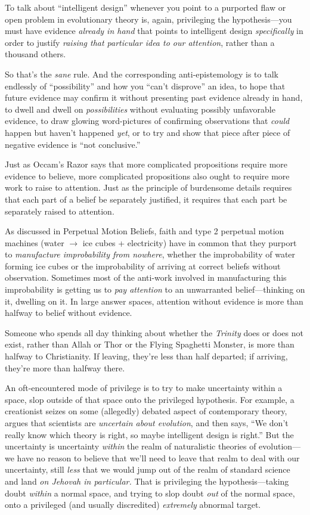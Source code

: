 {
 To talk about ``intelligent
design'' whenever you point to a purported flaw or
open problem in evolutionary theory is, again, privileging the
hypothesis---you must have evidence \textit{already in hand} that
points to intelligent design \textit{specifically} in order to justify
\textit{raising that particular idea to our attention}, rather than a
thousand others.}

{
 So that's the \textit{sane} rule. And the
corresponding anti-epistemology is to talk endlessly of
``possibility'' and how you
``can't disprove''
an idea, to hope that future evidence may confirm it without presenting
past evidence already in hand, to dwell and dwell on
\textit{possibilities} without evaluating possibly unfavorable
evidence, to draw glowing word-pictures of confirming observations that
\textit{could} happen but haven't happened
\textit{yet}, or to try and show that piece after piece of negative
evidence is ``not conclusive.''}

{
 Just as Occam's Razor says that more complicated
propositions require more evidence to believe, more complicated
propositions also ought to require more work to raise to attention.
Just as the principle of burdensome details requires that each part of
a belief be separately justified, it requires that each part be
separately raised to attention.}

{
 As discussed in Perpetual Motion Beliefs, faith and type 2
perpetual motion machines (water $\rightarrow $ ice cubes +
electricity) have in common that they purport to \textit{manufacture
improbability from nowhere}, whether the improbability of water forming
ice cubes or the improbability of arriving at correct beliefs without
observation. Sometimes most of the anti-work involved in manufacturing
this improbability is getting us to \textit{pay attention} to an
unwarranted belief---thinking on it, dwelling on it. In large answer
spaces, attention without evidence is more than halfway to belief
without evidence.}

{
 Someone who spends all day thinking about whether the
\textit{Trinity} does or does not exist, rather than Allah or Thor or
the Flying Spaghetti Monster, is more than halfway to Christianity. If
leaving, they're less than half departed; if arriving,
they're more than halfway there.}

{
 An oft-encountered mode of privilege is to try to make uncertainty
within a space, slop outside of that space onto the privileged
hypothesis. For example, a creationist seizes on some (allegedly)
debated aspect of contemporary theory, argues that scientists are
\textit{uncertain about evolution}, and then says,
``We don't really know which theory is
right, so maybe intelligent design is right.'' But
the uncertainty is uncertainty \textit{within} the realm of
naturalistic theories of evolution---we have no reason to believe that
we'll need to leave that realm to deal with our
uncertainty, still \textit{less} that we would jump out of the realm of
standard science and land \textit{on Jehovah in particular.} That is
privileging the hypothesis---taking doubt \textit{within} a normal
space, and trying to slop doubt \textit{out} of the normal space, onto
a privileged (and usually discredited) \textit{extremely} abnormal
target.}

